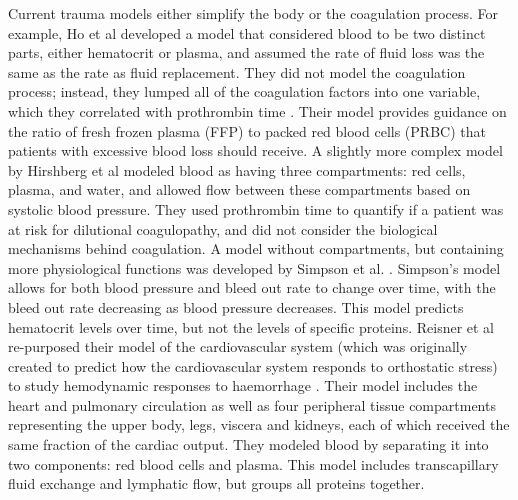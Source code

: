 \documentclass[12pt]{article}
\begin{document}
Current trauma models either simplify the body or the coagulation process.
For example, Ho et al developed a model that considered blood to be two distinct parts, either hematocrit or plasma, and assumed the rate of fluid loss was the same as the rate as fluid replacement. They did not model the coagulation process; instead, they lumped all of the coagulation factors into one variable, which they correlated with prothrombin time \cite{ho2005mathematical}.
Their model provides guidance on the ratio of fresh frozen plasma (FFP) to packed red blood cells (PRBC) that patients with excessive blood loss should receive.
A slightly more complex model by Hirshberg et al modeled blood as having three compartments: red cells, plasma, and water, and allowed flow between these compartments based on systolic blood pressure. \cite{hirshberg2003minimizing} They used prothrombin time to quantify if a patient was at risk for dilutional coagulopathy, and did not consider the biological mechanisms behind coagulation. A model without compartments, but containing more physiological functions was developed by Simpson et al. \cite{simpson1996computer}.
Simpson's model allows for both blood pressure and bleed out rate to change over time, with the bleed out rate decreasing as blood pressure decreases. This model predicts hematocrit levels over time, but not the levels of specific proteins. Reisner et al re-purposed their model of the cardiovascular system (which was originally created to predict how the cardiovascular system responds to orthostatic stress) to study hemodynamic responses to haemorrhage \cite{reisner2013computational}.
Their model includes the heart and pulmonary circulation as well as four peripheral tissue compartments representing the upper body, legs, viscera and kidneys, each of which received the same fraction of the cardiac output. They modeled blood by separating it into two components: red blood cells and plasma.
This model includes transcapillary fluid exchange and lymphatic flow, but groups all proteins together.
\end{document}

